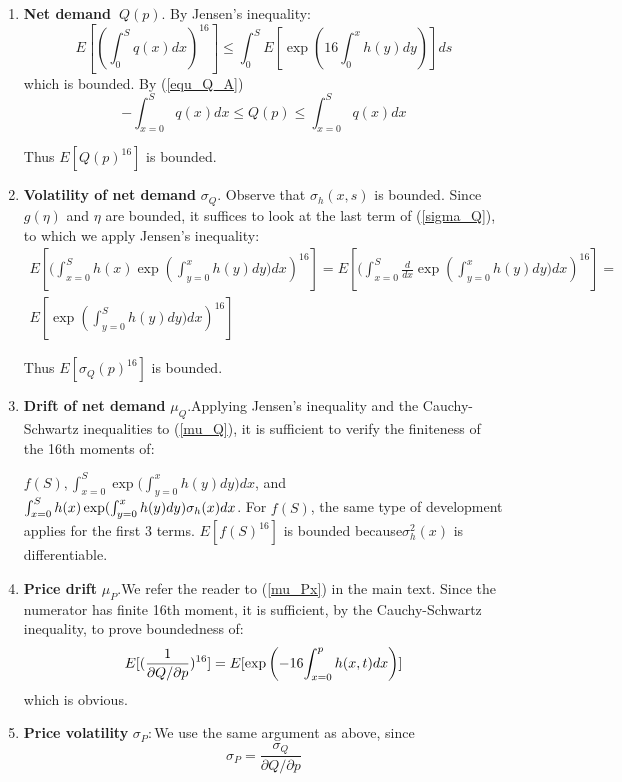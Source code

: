 \documentclass{article}
\begin{document}
\begin{enumerate}
\item \textbf{Net demand\ }$Q(p).$ By Jensen's inequality:%
\begin{equation*}
E[(\int_{0}^{S}q(x)dx)^{16}]\leq \int_{0}^{S}E[\exp (16\int_{0}^{x}h(y)dy)]ds
\end{equation*}%
which is bounded. By (\ref{equ_Q_A})
\begin{equation*}
-\int_{x=0}^{S}q(x)dx\leq Q(p)\leq \int_{x=0}^{S}q(x)dx
\end{equation*}

Thus $E[Q(p)^{16}]$ is bounded.

\item \textbf{Volatility of net demand }$\sigma _{Q}$.  Observe that $\sigma
_{h}(x,s)$ is bounded. Since $g(\eta )$ and $\eta $ are bounded, it suffices
to look at the last term of (\ref{sigma_Q}), to which we apply Jensen's
inequality:%
\begin{gather*}
E[(\int_{x=0}^{S}{h(x)}\exp ({\int_{y=0}^{x}h(y)dy)}dx)^{16}]=E[(%
\int_{x=0}^{S}\frac{d}{dx}\exp ({\int_{y=0}^{x}h(y)dy)}dx)^{16}]= \\
E[\exp ({\int_{y=0}^{S}h(y)dy)}dx)^{16}]
\end{gather*}

Thus $E[\sigma _{Q}(p)^{16}]$ is bounded.

\item \textbf{Drift of net demand }$\mu _{Q}.$Applying Jensen's inequality
and the Cauchy-Schwartz inequalities to (\ref{mu_Q}), it is sufficient to
verify the finiteness of the 16th moments of:

$f(S),\int_{x=0}^{S}\exp ({\int_{y=0}^{x}h(y)dy)dx}$, and $\int_{x=0}^{S}{%
h(x)}\exp ({\int_{y=0}^{x}h(y)dy)\sigma _{h}(x)dx}$. For $f(S)$, the same
type of development applies for the first 3 terms. $E[f(S)^{16}]$ is bounded
because$\sigma _{h}^{2}(x)$ is differentiable.

\item \textbf{Price drift }$\mu _{P}.$We refer the reader to (\ref{mu_Px}) in
the main text. Since the numerator has finite 16th moment, it is sufficient,
by the Cauchy-Schwartz inequality, to prove boundedness of:%
\begin{equation*}
E[(\frac{1}{\partial Q/\partial p})^{16}]=E[\exp \left( -16{%
\int_{x=0}^{p}h(x,t)dx}\right) ]
\end{equation*}%
\qquad which is obvious.

\item \textbf{Price volatility }$\sigma _{P}:$We use the same argument as
above, since%
\begin{equation*}
\sigma _{P}=\frac{\sigma _{Q}}{\partial Q/\partial p}
\end{equation*}


\end{enumerate}
\end{document}
